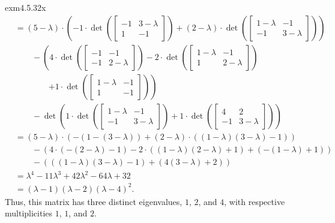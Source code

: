 \begin{exm}{}{exm4.5.32x}
{\begin{equation}
\begin{split}
			& =(5-\lambda)\cdot \left( -1\cdot \det \left( \begin{bmatrix}-1 & 3-\lambda \\ 1 & -1\end{bmatrix}\right) +(2-\lambda )\cdot \det \left( \begin{bmatrix}1-\lambda & -1 \\ -1 & 3-\lambda\end{bmatrix}\right) \right) \\ & \qquad -\left( 4\cdot \det \left( \begin{bmatrix}-1 & -1 \\ -1 & 2-\lambda \end{bmatrix}\right) -2\cdot \det \left( \begin{bmatrix}1-\lambda & -1 \\ 1 & 2-\lambda \end{bmatrix}\right) \right. \\ & \qquad \qquad \left. +1\cdot \det \left( \begin{bmatrix}1-\lambda & -1 \\ 1 & -1\end{bmatrix}\right) \right) \\ & \qquad -\det \left( 1\cdot \det \left( \begin{bmatrix}1-\lambda & -1 \\ -1 & 3-\lambda \end{bmatrix}\right) +1\cdot \det \left( \begin{bmatrix}4 & 2 \\ -1 & 3-\lambda \end{bmatrix}\right) \right) \\
			& =(5-\lambda) \cdot \left( -(1-(3-\lambda ))+(2-\lambda )\cdot ((1-\lambda )(3-\lambda )-1)\right) \\ & \qquad -\left( 4\cdot (-(2-\lambda )-1)-2\cdot ((1-\lambda )(2-\lambda )+1)+(-(1-\lambda )+1)\right) \\ & \qquad -\left( ((1-\lambda )(3-\lambda )-1)+(4(3-\lambda )+2)\right) \\
			& =\lambda ^4-11\lambda ^3+42\lambda ^2-64\lambda +32 \\
			& =(\lambda -1)(\lambda -2)(\lambda -4)^2.
		\end{split}
	\end{equation}
	}
	Thus, this matrix has three distinct eigenvalues, $1$, $2$, and $4$, with respective multiplicities $1$, $1$, and $2$.
\end{exm}

